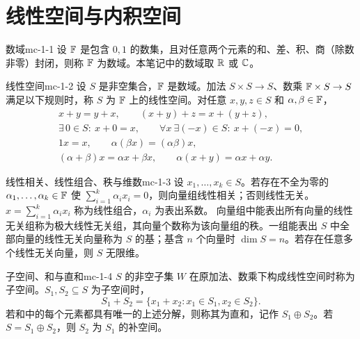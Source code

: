 \section{线性空间与内积空间}

\begin{definition}{数域}{mc-1-1}
设 $\mathbb{F}$ 是包含 $0,1$ 的数集，且对任意两个元素的和、差、积、商（除数非零）封闭，则称 $\mathbb{F}$ 为数域。本笔记中的数域取 $\mathbb{R}$ 或 $\mathbb{C}$。
\end{definition}

\begin{definition}{线性空间}{mc-1-2}
设 $S$ 是非空集合，$\mathbb{F}$ 是数域。加法 $S\times S\to S$、数乘 $\mathbb{F}\times S\to S$ 满足以下规则时，称 $S$ 为 $\mathbb{F}$ 上的线性空间。对任意 $x,y,z\in S$ 和 $\alpha,\beta\in\mathbb{F}$，
\[
\begin{gathered}
x+y=y+x,\qquad(x+y)+z=x+(y+z),\\
\exists\,0\in S:\ x+0=x,\qquad\forall x\ \exists(-x)\in S:\ x+(-x)=0,\\
1x=x,\qquad\alpha(\beta x)=(\alpha\beta)x,\\
(\alpha+\beta)x=\alpha x+\beta x,\qquad\alpha(x+y)=\alpha x+\alpha y.
\end{gathered}
\]
\end{definition}

\begin{definition}{线性相关、线性组合、秩与维数}{mc-1-3}
设 $x_1,\ldots,x_k\in S$。若存在不全为零的 $\alpha_1,\ldots,\alpha_k\in\mathbb{F}$ 使 $\sum_{i=1}^k\alpha_ix_i=0$，则向量组线性相关；否则线性无关。$x=\sum_{i=1}^k\alpha_ix_i$ 称为线性组合，$\alpha_i$ 为表出系数。
向量组中能表出所有向量的线性无关组称为极大线性无关组，其向量个数称为该向量组的秩。一组能表出 $S$ 中全部向量的线性无关向量称为 $S$ 的基；基含 $n$ 个向量时 $\dim S=n$。若存在任意多个线性无关向量，则 $S$ 无限维。
\end{definition}

\begin{definition}{子空间、和与直和}{mc-1-4}
$S$ 的非空子集 $W$ 在原加法、数乘下构成线性空间时称为子空间。$S_1,S_2\subseteq S$ 为子空间时，
\[S_1+S_2=\{x_1+x_2:x_1\in S_1,x_2\in S_2\}.\]
若和中的每个元素都具有唯一的上述分解，则称其为直和，记作 $S_1\oplus S_2$。若 $S=S_1\oplus S_2$，则 $S_2$ 为 $S_1$ 的补空间。
\end{definition}


